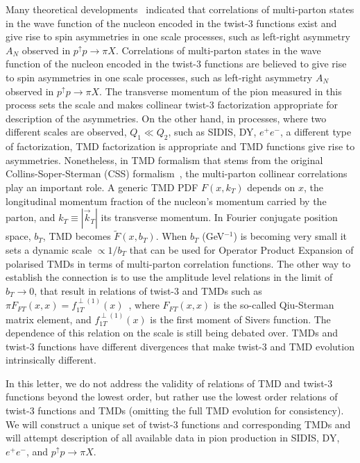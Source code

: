 \documentclass[twocolumn,prl,aps,superscriptaddress
               ,footinbib,amsfonts,amsmath,amssymb,showpacs]{revtex4-1}
\newcommand{\new}[1]{{\color{blue}#1}}
\begin{document}


\new{Many theoretical developments~\cite{Efremov:1981sh, Efremov:1984ip, Qiu:1991pp, Qiu:1998ia,Kouvaris:2006zy, Eguchi:2006mc, Koike:2009ge, Metz:2012ct,Kanazawa:2013uia, Beppu:2013uda} indicated that correlations of multi-parton states in the wave function of the nucleon encoded in the twist-3 functions 
 exist and give rise to spin asymmetries in one scale processes, such as left-right asymmetry $A_N$ observed in $p^\uparrow p \to \pi X$. Correlations of multi-parton states in the wave function of the nucleon encoded in the twist-3 functions are believed to give rise to spin asymmetries in one scale processes, such as left-right asymmetry $A_N$ observed in $p^\uparrow p \to \pi X$.
The transverse momentum of the pion  measured in this process sets the scale and makes collinear twist-3 factorization appropriate for description of the asymmetries. On the other hand, in processes, where two different scales are observed, $Q_1 \ll Q_2$, such as SIDIS, DY, $e^+e^-$, a different type of factorization, TMD factorization is 
 appropriate and TMD functions give rise to asymmetries. Nonetheless, in TMD formalism that stems from the original  Collins-Soper-Sterman (CSS)
formalism~\cite{Collins:2011zzd}, the multi-parton collinear correlations play an important role. A generic TMD PDF $F(x,k_T)$ depends on $x$, the longitudinal
momentum fraction of the nucleon's momentum carried by the parton, and $k_T\equiv |\vec{k}_T|$ its
transverse momentum. In Fourier conjugate position space, $b_T$, TMD becomes $\tilde F(x,b_T)$. When $b_T$ (GeV$^{-1}$) is becoming very small it sets a dynamic scale $\propto 1/b_T$ that can be used for Operator Product Expansion of polarised TMDs in terms of multi-parton correlation functions. The other way to establish the  connection is to use the amplitude level relations in the limit of $b_T\to 0$, that result in relations of twist-3 and TMDs such as $\pi F_{FT}(x,x)=f_{1T}^{\perp(1)}(x)$~\cite{Boer:2003cm}, where $F_{FT}(x,x)$ is the so-called Qiu-Sterman matrix element, and $f_{1T}^{\perp(1)}(x)$ is the first moment of Sivers function. The dependence of this relation on the scale is still being debated over. TMDs and twist-3 functions have different divergences that make twist-3 and TMD evolution intrinsically different.

In this letter, we do not address the validity of relations of TMD and twist-3 functions beyond the lowest order, but rather use the lowest order relations of twist-3 functions and TMDs (omitting the full TMD evolution for consistency). We will construct a unique set of twist-3 functions and corresponding TMDs and will attempt description of all available data in pion production in SIDIS, DY, $e^+e^-$, and $p^\uparrow p \to \pi X$. 
}
\end{document}
